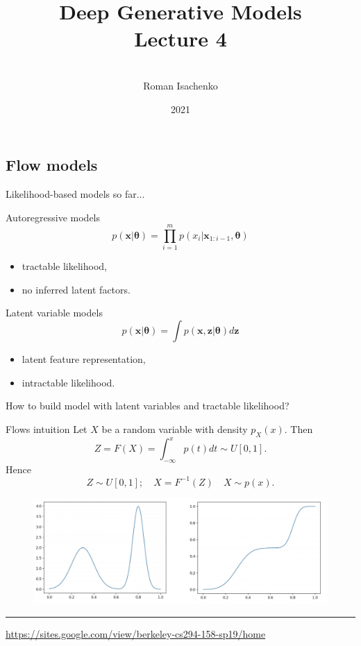 \documentclass{beamer}
\title[\hbox to 56mm{Deep Generative Models  \hfill\insertframenumber\,/\,\inserttotalframenumber}]
{Deep Generative Models \\ Lecture 4}
\author[Roman Isachenko]{\\Roman Isachenko}
\institute[Ozon]{Ozon Masters \\
}
\date{2021}
\newcommand{\bx}{\mathbf{x}}
\newcommand{\bz}{\mathbf{z}}
\newcommand{\btheta}{\boldsymbol{\theta}}
\begin{document}
\begin{frame}
\titlepage
\end{frame}
\subsection{Flow models}
\begin{frame}{Likelihood-based models so far...}
	\begin{minipage}[t]{0.5\columnwidth}
		\begin{block}{Autoregressive models}
			\vspace{-0.5cm}
			\[
			p(\bx|\btheta) = \prod_{i=1}^m p(x_i | \bx_{1:i - 1}, \btheta)
			\]
			\vspace{-0.2cm}
			\begin{itemize}
				\item tractable likelihood, 
				\item no inferred latent factors.
			\end{itemize}
		\end{block}
	\end{minipage}%
	\begin{minipage}[t]{0.5\columnwidth}
		\begin{block}{Latent variable models}
			\[
			p(\bx| \btheta) = \int p(\bx, \bz | \btheta) d \bz
			\]
			\begin{itemize}
				\item latent feature representation, 
				\item intractable likelihood.
			\end{itemize}
		\end{block}
	\end{minipage}
	
	\vspace{1cm } 
	How to build model with latent variables and tractable likelihood?
\end{frame}
\begin{frame}{Flows intuition}
	Let $X$ be a random variable with density $p_X(x)$. Then
	\[
	Z = F(X) = \int_{-\infty}^x p(t)dt \sim U[0, 1].
	\]
	Hence
	\[
	Z \sim U[0, 1]; \quad X = F^{-1}(Z) \quad X \sim p(x).
	\]
	\begin{figure}
		\includegraphics[width=\linewidth]{figs/flows_1d}
	\end{figure}
	
	\vfill
	\hrule\medskip
	{\scriptsize \href{https://sites.google.com/view/berkeley-cs294-158-sp19/home}{https://sites.google.com/view/berkeley-cs294-158-sp19/home}}
	
\end{frame}
\end{document}
